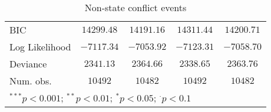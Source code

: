 \begin{sidewaystable}
\begin{center}
{\begin{tabular}{l c c c c}
BIC                               & $14299.48$    & $14191.16$    & $14311.44$    & $14200.71$    \\
Log Likelihood                    & $-7117.34$    & $-7053.92$    & $-7123.31$    & $-7058.70$    \\
Deviance                          & $2341.13$     & $2364.66$     & $2338.65$     & $2363.76$     \\
Num. obs.                         & $10492$       & $10482$       & $10492$       & $10482$       \\
\hline
\multicolumn{5}{l}{\scriptsize{$^{***}p<0.001$; $^{**}p<0.01$; $^{*}p<0.05$; $^{\cdot}p<0.1$}}
\end{tabular}
}
\caption{Non-state conflict events}
\label{non_state}
\end{center}
\end{sidewaystable}
